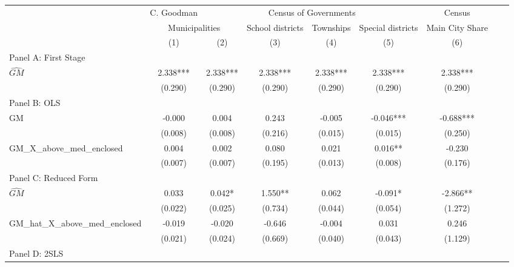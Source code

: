  \begin{tabular}{l*{8}{c}} \toprule
&\multicolumn{1}{c}{C. Goodman}&\multicolumn{4}{c}{Census of Governments}&\multicolumn{1}{c}{Census}\\\cmidrule(lr){2-2}\cmidrule(lr){3-6}\cmidrule(lr){7-7}
&\multicolumn{2}{c}{Municipalities}&\multicolumn{1}{c}{School districts}&\multicolumn{1}{c}{Townships}&\multicolumn{1}{c}{Special districts}&\multicolumn{1}{c}{Main City Share}\\\cmidrule(lr){2-3}\cmidrule(lr){4-6}\cmidrule(lr){7-7}
&\multicolumn{1}{c}{(1)}&\multicolumn{1}{c}{(2)}&\multicolumn{1}{c}{(3)}&\multicolumn{1}{c}{(4)}&\multicolumn{1}{c}{(5)}&\multicolumn{1}{c}{(6)}\\
\cmidrule(lr){1-7}
\multicolumn{6}{l}{Panel A: First Stage}\\
\cmidrule(lr){1-7}
$\widehat{GM}$  &    2.338***&    2.338***&    2.338***&    2.338***&    2.338***&    2.338***\\
                &  (0.290)   &  (0.290)   &  (0.290)   &  (0.290)   &  (0.290)   &  (0.290)   \\
\cmidrule(lr){1-7}
\multicolumn{6}{l}{Panel B: OLS}\\
\cmidrule(lr){1-7}
GM              &   -0.000   &    0.004   &    0.243   &   -0.005   &   -0.046***&   -0.688***\\
                &  (0.008)   &  (0.008)   &  (0.216)   &  (0.015)   &  (0.015)   &  (0.250)   \\
\addlinespace
GM\_X\_above\_med\_enclosed&    0.004   &    0.002   &    0.080   &    0.021   &    0.016** &   -0.230   \\
                &  (0.007)   &  (0.007)   &  (0.195)   &  (0.013)   &  (0.008)   &  (0.176)   \\
\cmidrule(lr){1-7}
\multicolumn{6}{l}{Panel C: Reduced Form}\\
\cmidrule(lr){1-7}
$\widehat{GM}$  &    0.033   &    0.042*  &    1.550** &    0.062   &   -0.091*  &   -2.866** \\
                &  (0.022)   &  (0.025)   &  (0.734)   &  (0.044)   &  (0.054)   &  (1.272)   \\
\addlinespace
GM\_hat\_X\_above\_med\_enclosed&   -0.019   &   -0.020   &   -0.646   &   -0.004   &    0.031   &    0.246   \\
                &  (0.021)   &  (0.024)   &  (0.669)   &  (0.040)   &  (0.043)   &  (1.129)   \\
\cmidrule(lr){1-7}
\multicolumn{6}{l}{Panel D: 2SLS}\\

\end{tabular}

